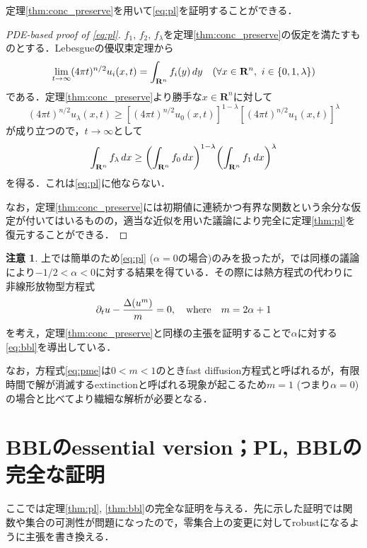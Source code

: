 \documentclass[a4j]{ltjsarticle}
\newcommand{\Rset}{\mathbf{R}}
\newcommand{\1}{\bm{1}}
\numberwithin{equation}{section}
\theoremstyle{definition}
\newtheorem{rmk}[thm]{注意}
\begin{document}
定理\ref{thm:conc_preserve}を用いて\eqref{eq:pl}を証明することができる．
\begin{proof}[PDE-based proof of \eqref{eq:pl}]
    $f_1,\,f_2,\,f_\lambda$を定理\ref{thm:conc_preserve}の仮定を満たすものとする．Lebesgueの優収束定理から
    \begin{equation}
        \lim_{t\to\infty}(4\pi t)^{n/2}u_i(x,t)=\int_{\Rset^n}f_i(y)\,dy\quad (\forall x\in\Rset^n,\ i\in\qty{0,1,\lambda})
    \end{equation}
    である．定理\ref{thm:conc_preserve}より勝手な$x\in\Rset^n$に対して
    \begin{equation}
        (4\pi t)^{n/2}u_{\lambda}(x,t)\geq [(4\pi t)^{n/2}u_0(x,t)]^{1-\lambda}[(4\pi t)^{n/2} u_1(x,t)]^{\lambda}
    \end{equation}
    が成り立つので，$t\to\infty$として
    \begin{equation}
        \int_{\Rset^n}f_\lambda\,dx\geq \qty(\int_{\Rset^n}f_0\,dx)^{1-\lambda}\qty(\int_{\Rset^n}f_1\,dx)^{\lambda}
    \end{equation}
    を得る．これは\eqref{eq:pl}に他ならない．

    なお，定理\ref{thm:conc_preserve}には初期値に連続かつ有界な関数という余分な仮定が付いてはいるものの，適当な近似を用いた議論により完全に定理\ref{thm:pl}を復元することができる．
\end{proof}
\begin{rmk}
    上では簡単のため\eqref{eq:pl} ($\alpha=0$の場合)のみを扱ったが，\cite{ILS}では同様の議論により$-1/2<\alpha<0$に対する結果を得ている．その際には熱方程式の代わりに非線形放物型方程式
    \begin{equation}
        \partial_t u-\frac{\Delta\qty(u^m)}{m}=0,\quad \text{where}\quad m=2\alpha+1\label{eq:pme}
    \end{equation}
    を考え，定理\ref{thm:conc_preserve}と同様の主張を証明することで$\alpha$に対する\eqref{eq:bbl}を導出している．

    なお，方程式\eqref{eq:pme}は$0<m<1$のときfast diffusion方程式と呼ばれるが，有限時間で解が消滅するextinctionと呼ばれる現象が起こるため$m=1$ (つまり$\alpha=0$)の場合と比べてより繊細な解析が必要となる．
\end{rmk}

\appendix
\section{BBLのessential version；PL, BBLの完全な証明}\label{sec:ess_bbl}
\def\thesection{\Alph{section}}
ここでは定理\ref{thm:pl}, \ref{thm:bbl}の完全な証明を与える．先に示した証明では関数や集合の可測性が問題になったので，零集合上の変更に対してrobustになるように主張を書き換える．
\end{document}
